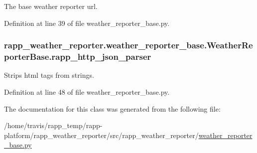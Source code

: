 The base weather reporter url. 



Definition at line 39 of file weather\-\_\-reporter\-\_\-base.\-py.

\hypertarget{classrapp__weather__reporter_1_1weather__reporter__base_1_1WeatherReporterBase_ac18124b549d9ff6e54551b96013e953d}{
\subsubsection[{rapp\-\_\-http\-\_\-json\-\_\-parser}]{\setlength{\rightskip}{0pt plus 5cm}rapp\-\_\-weather\-\_\-reporter.\-weather\-\_\-reporter\-\_\-base.\-Weather\-Reporter\-Base.\-rapp\-\_\-http\-\_\-json\-\_\-parser}}\label{classrapp__weather__reporter_1_1weather__reporter__base_1_1WeatherReporterBase_ac18124b549d9ff6e54551b96013e953d}


Strips html tags from strings. 



Definition at line 48 of file weather\-\_\-reporter\-\_\-base.\-py.



The documentation for this class was generated from the following file\-:\begin{DoxyCompactItemize}
\item 
/home/travis/rapp\-\_\-temp/rapp-\/platform/rapp\-\_\-weather\-\_\-reporter/src/rapp\-\_\-weather\-\_\-reporter/\hyperlink{weather__reporter__base_8py}{weather\-\_\-reporter\-\_\-base.\-py}\end{DoxyCompactItemize}
